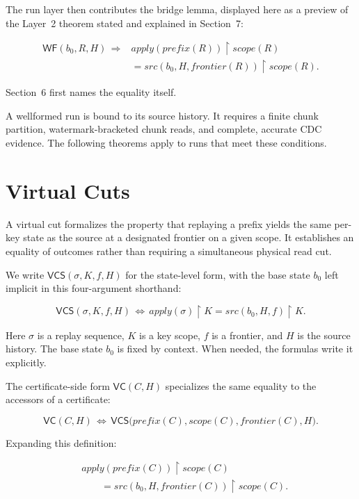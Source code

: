 \documentclass[letterpaper,10pt,twocolumn]{article}
\newcommand{\restrict}{\mathbin{\upharpoonright}}
\newcommand{\Apply}{\mathit{apply}}
\newcommand{\Src}{\mathit{src}}
\newcommand{\Scope}{\mathit{scope}}
\newcommand{\Frontier}{\mathit{frontier}}
\newcommand{\CleanPrefix}{\mathit{prefix}}
\newcommand{\WF}{\mathsf{WF}}
\newcommand{\VC}{\mathsf{VC}}
\newcommand{\VCS}{\mathsf{VCS}}
\begin{document}
The run layer then contributes the bridge lemma, displayed here as a
preview of the Layer~2 theorem stated and explained in Section~7:

\[
\begin{aligned}
  \WF(b_0,R,H) \,\Longrightarrow{}&
    \Apply(\CleanPrefix(R)) \restrict \Scope(R)\\
  &{}= \Src(b_0,H,\Frontier(R)) \restrict \Scope(R).
\end{aligned}
\]

Section~6 first names the equality itself.

A wellformed run is bound to its source history. It requires a finite
chunk partition, watermark-bracketed chunk reads, and complete, accurate
CDC evidence. The following theorems apply to runs that meet these conditions.

\section{Virtual Cuts}\label{virtual-cuts}

\enlargethispage{2\baselineskip}

A virtual cut formalizes the property that replaying a prefix yields the same per-key state as the
source at a designated frontier on a given scope. It establishes an equality of
outcomes rather than requiring a simultaneous physical read cut.

We write $\VCS(\sigma,K,f,H)$ for the state-level form, with the base
state $b_0$ left implicit in this four-argument shorthand:

\[
  \VCS(\sigma,K,f,H) \,\Longleftrightarrow\,
    \Apply(\sigma) \restrict K = \Src(b_0,H,f) \restrict K.
\]

Here $\sigma$ is a replay sequence, $K$ is a key scope,
$f$ is a frontier, and $H$ is the source history. The base
state $b_0$ is fixed by context. When needed, the formulas
write it explicitly.

The certificate-side form $\VC(C,H)$ specializes the same equality to
the accessors of a certificate:

\[
\VC(C,H) \,\Longleftrightarrow\,
  \VCS\bigl(\CleanPrefix(C),\Scope(C),\Frontier(C),H\bigr).
\]

Expanding this definition:

\[
\begin{aligned}
&\Apply(\CleanPrefix(C)) \restrict \Scope(C)\\
&\qquad= \Src(b_0,H,\Frontier(C)) \restrict \Scope(C).
\end{aligned}
\]
\end{document}
